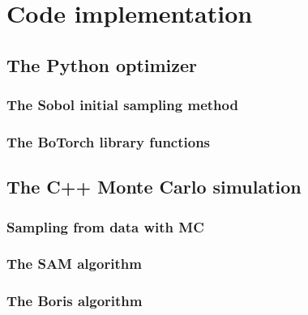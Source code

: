 \documentclass{article}
\begin{document}
	\section{Code implementation}
	\subsection{The Python optimizer}
	\subsubsection{The Sobol initial sampling method}
	\subsubsection{The BoTorch library functions}
	\subsection{The C++ Monte Carlo simulation}
	\subsubsection{Sampling from data with MC}
	\subsubsection{The SAM algorithm}
	\subsubsection{The Boris algorithm}
	
	
	\clearpage
	\nocite{*}
	\printbibliography
\end{document}
